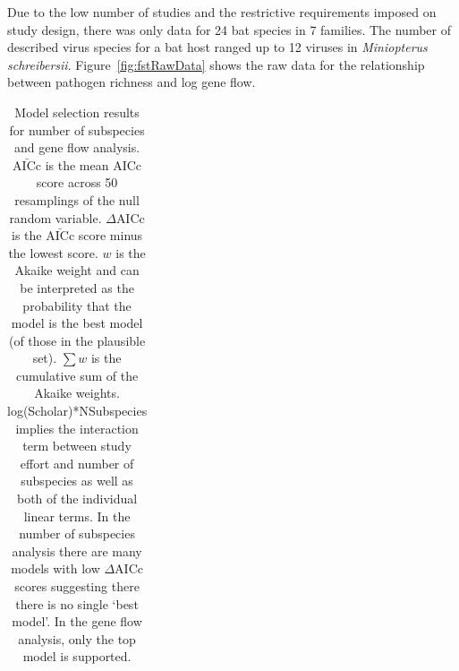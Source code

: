 Due to the low number of studies and the restrictive requirements imposed on study design, there was only data for 24 bat species in 7 families.
The number of described virus species for a bat host ranged up to 12 viruses in \emph{Miniopterus schreibersii}.
Figure~\ref{fig:fstRawData} shows the raw data for the relationship between pathogen richness and log gene flow.



\begin{table}[t]
\centering
\caption[Model selection results for number of subspecies analysis]{
Model selection results for number of subspecies and gene flow analysis. 
$\bar{\text{AICc}}$ is the mean AICc score across 50 resamplings of the null random variable. 
$\Delta$AICc is the $\bar{\text{AICc}}$ score minus the lowest score. 
$w$ is the Akaike weight and can be interpreted as the probability that the model is the best model (of those in the plausible set).
$\sum w$ is the cumulative sum of the Akaike weights.
log(Scholar)*NSubspecies implies the interaction term between study effort and number of subspecies as well as both of the individual linear terms.
In the number of subspecies analysis there are many models with low $\Delta$AICc scores suggesting there there is no single `best model'.
In the gene flow analysis, only the top model is supported.
}

\begin{tabular}{@{}>{\footnotesize}p{8cm}rrrr@{}}


\end{tabular}
\end{table}
